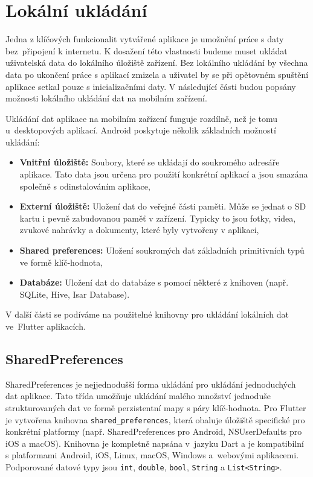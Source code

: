 \documentclass[czech, bc, kiv, he, iso690numb]{fasthesis}
\begin{document}
\section{Lokální ukládání} 

Jedna z klíčových funkcionalit vytvářené aplikace je umožnění práce s daty bez~připojení k internetu. K dosažení této vlastnosti budeme muset ukládat uživatelská data do lokálního úložiště zařízení. Bez lokálního ukládání by všechna data po ukončení práce s aplikací zmizela a uživatel by se při opětovném spuštění aplikace setkal pouze s inicializačními daty. V následující části budou popsány možnosti lokálního ukládání dat na mobilním zařízení.

Ukládání dat aplikace na mobilním zařízení funguje rozdílně, než je tomu u~desktopových aplikací. Android poskytuje několik základních možností ukládání:
 

\begin{itemize}
    \item \textbf{Vnitřní úložiště:} Soubory, které se ukládají do soukromého adresáře aplikace. Tato data jsou určena pro použití konkrétní aplikací a jsou smazána společně s odinstalováním aplikace,
    \item \textbf{Externí úložiště:} Uložení dat do veřejné části paměti. Může se jednat o \gls{SD} kartu i pevně zabudovanou paměť v zařízení. Typicky to jsou fotky, videa, zvukové nahrávky a dokumenty, které byly vytvořeny v aplikaci,
    \item \textbf{Shared preferences:} Uložení soukromých dat základních primitivních typů ve formě klíč-hodnota,
    \item \textbf{Databáze:} Uložení dat do databáze s pomocí některé z knihoven (např. SQLite, Hive, Isar Database). \cite{android-storage} \cite{mistrostvi_android}
\end{itemize}

V další části se podíváme na použitelné knihovny pro ukládání lokálních dat ve~Flutter aplikacích.

\subsection{SharedPreferences}\label{Shared_preferences} 

SharedPreferences je nejjednodušší forma ukládání pro ukládání jednoduchých dat aplikace. Tato třída umožňuje ukládání malého množství jednoduše strukturovaných dat ve formě perzistentní mapy s páry klíč-hodnota. Pro Flutter je vytvořena knihovna \texttt{shared\_preferences}, která obaluje úložiště specifické pro konkrétní platformy (např. SharedPreferences pro Android, NSUserDefaults pro iOS a macOS). Knihovna je kompletně napsána v~jazyku Dart a je kompatibilní s platformami Android, iOS, Linux, macOS, Windows a~webovými aplikacemi. Podporované datové typy jsou \texttt{int}, \texttt{double}, \texttt{bool}, \texttt{String} a \texttt{List<String>}. \cite{mistrostvi_android} \cite{Shared_preferences_package}
\end{document}
